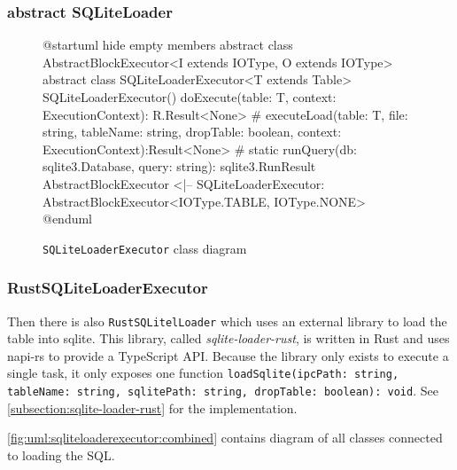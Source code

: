 \subsubsection{abstract SQLiteLoader}
\begin{figure}
	\begin{plantuml}
		@startuml
		hide empty members
		abstract class AbstractBlockExecutor<I extends IOType, O extends IOType>
		abstract class SQLiteLoaderExecutor<T extends Table> {
		SQLiteLoaderExecutor()
		doExecute(table: T, context: ExecutionContext): R.Result<None>
		# executeLoad(table: T, file: string, tableName: string, dropTable: boolean, context: ExecutionContext):Result<None>
		# {static} runQuery(db: sqlite3.Database, query: string): sqlite3.RunResult
		}
		AbstractBlockExecutor <|-- SQLiteLoaderExecutor: AbstractBlockExecutor<IOType.TABLE, IOType.NONE>
		@enduml
	\end{plantuml}
	\caption{\Verb|SQLiteLoaderExecutor| class diagram}
	\label{fig:uml:sqliteloader}
\end{figure}

\subsubsection{RustSQLiteLoaderExecutor}
Then there is also \Verb|RustSQLitelLoader| which uses an external library to load the table into sqlite.
This library, called \emph{sqlite-loader-rust}, is written in Rust and uses napi-rs to provide a TypeScript \ac{API}.
Because the library only exists to execute a single task, it only exposes one function \texttt{loadSqlite(ipcPath: string, tableName: string, sqlitePath: string, dropTable: boolean): void}.
See \ref{subsection:sqlite-loader-rust} for the implementation.

\ref{fig:uml:sqliteloaderexecutor:combined} contains diagram of all classes connected to loading the \ac{SQL}.


